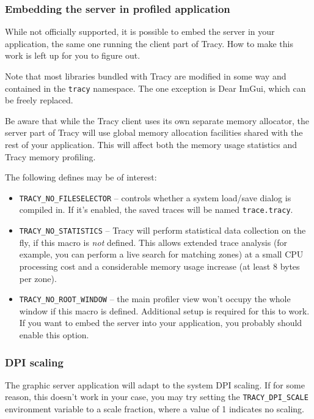 \documentclass[hidelinks,titlepage,a4paper,twoside]{article}
\begin{document}
\subsubsection{Embedding the server in profiled application}
\label{embeddingserver}

While not officially supported, it is possible to embed the server in your application, the same one running the client part of Tracy. How to make this work is left up for you to figure out.

Note that most libraries bundled with Tracy are modified in some way and contained in the \texttt{tracy} namespace. The one exception is Dear ImGui, which can be freely replaced.

Be aware that while the Tracy client uses its own separate memory allocator, the server part of Tracy will use global memory allocation facilities shared with the rest of your application. This will affect both the memory usage statistics and Tracy memory profiling.

The following defines may be of interest:

\begin{itemize}
\item \texttt{TRACY\_NO\_FILESELECTOR} -- controls whether a system load/save dialog is compiled in. If it's enabled, the saved traces will be named \texttt{trace.tracy}.
\item \texttt{TRACY\_NO\_STATISTICS} -- Tracy will perform statistical data collection on the fly, if this macro is \emph{not} defined. This allows extended trace analysis (for example, you can perform a live search for matching zones) at a small CPU processing cost and a considerable memory usage increase (at least 8 bytes per zone).
\item \texttt{TRACY\_NO\_ROOT\_WINDOW} -- the main profiler view won't occupy the whole window if this macro is defined. Additional setup is required for this to work. If you want to embed the server into your application, you probably should enable this option.
\end{itemize}

\subsubsection{DPI scaling}

The graphic server application will adapt to the system DPI scaling. If for some reason, this doesn't work in your case, you may try setting the \texttt{TRACY\_DPI\_SCALE} environment variable to a scale fraction, where a value of 1 indicates no scaling.
\end{document}
